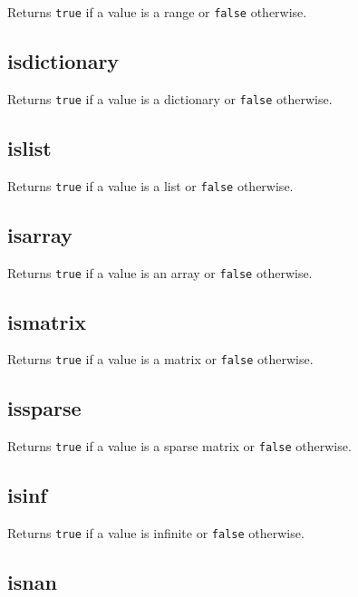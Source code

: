 Returns \texttt{true} if a value is a range or \texttt{false} otherwise.

\hypertarget{isdictionary}{%
\subsection{isdictionary}\label{isdictionary}}

Returns \texttt{true} if a value is a dictionary or \texttt{false}
otherwise.

\hypertarget{islist}{%
\subsection{islist}\label{islist}}

Returns \texttt{true} if a value is a list or \texttt{false} otherwise.

\hypertarget{isarray}{%
\subsection{isarray}\label{isarray}}

Returns \texttt{true} if a value is an array or \texttt{false}
otherwise.

\hypertarget{ismatrix}{%
\subsection{ismatrix}\label{ismatrix}}

Returns \texttt{true} if a value is a matrix or \texttt{false}
otherwise.

\hypertarget{issparse}{%
\subsection{issparse}\label{issparse}}

Returns \texttt{true} if a value is a sparse matrix or \texttt{false}
otherwise.

\hypertarget{isinf}{%
\subsection{isinf}\label{isinf}}

Returns \texttt{true} if a value is infinite or \texttt{false}
otherwise.

\hypertarget{isnan}{%
\subsection{isnan}\label{isnan}}


